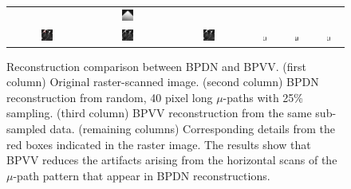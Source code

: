 \documentclass[twocolumn,oneside]{IEEEtran/IEEEtran}
\begin{document}
\begin{figure}[h!]
\begin{tabular}{cccccc}
    &\includegraphics[width=0.16\textwidth]{figures-SBA/anothergrating_bptv_40mu_zoomin}\\
    \includegraphics[width=0.16\textwidth]{figures-SBA/dnaforbptv_gt_framed}
    & \includegraphics[width=0.16\textwidth]{figures-SBA/dnaforbptv_40mu}
    & \includegraphics[width=0.16\textwidth]{figures-SBA/dnaforbptv_bptv_40mu}
    & \includegraphics[width=0.16\textwidth]{figures-SBA/dnaforbptv_gt_zoomin}
    & \includegraphics[width=0.16\textwidth]{figures-SBA/dnaforbptv_40mu_zoomin}
    & \includegraphics[width=0.16\textwidth]{figures-SBA/dnaforbptv_bptv_40mu_zoomin}
  \end{tabular}
  \caption{Reconstruction comparison between BPDN and BPVV. (first column)
    Original raster-scanned image. (second column) BPDN reconstruction from
    random, 40 pixel long $\mu$-paths with 25\% sampling. (third column) BPVV
    reconstruction from the same sub-sampled data. (remaining columns)
    Corresponding details from the red boxes indicated in the raster image. The
    results show that BPVV reduces the artifacts arising from the horizontal
    scans of the $\mu$-path pattern that appear in BPDN reconstructions.}
  \label{fig:BPTV_demonstration}
\end{figure}
\endgroup
\end{document}
